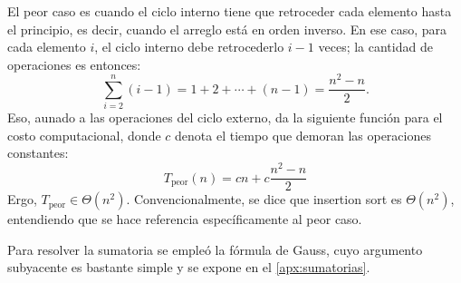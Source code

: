 El peor caso es cuando el ciclo interno tiene que retroceder cada elemento hasta el principio, es decir, cuando el arreglo está en orden inverso. En ese caso, para cada elemento \(i\), el ciclo interno debe retrocederlo \(i-1\) veces; la cantidad de operaciones es entonces:
\[\sum_{i=2}^n (i-1) = 1+2+\cdots+(n-1) = \frac{n^2-n}{2}.\]
Eso, aunado a las operaciones del ciclo externo, da la siguiente función para el costo computacional, donde \(c\) denota el tiempo que demoran las operaciones constantes:
\[T_\text{peor}(n) = cn + c\frac{n^2-n}{2}\]
Ergo, \(T_\text{peor} \in \Theta(n^2)\). Convencionalmente, se dice que insertion sort es \(\Theta(n^2)\), entendiendo que se hace referencia específicamente al peor caso.

\begin{tip}
Para resolver la sumatoria se empleó la fórmula de Gauss, cuyo argumento subyacente es bastante simple y se expone en el \ref{apx:sumatorias}.
\end{tip}